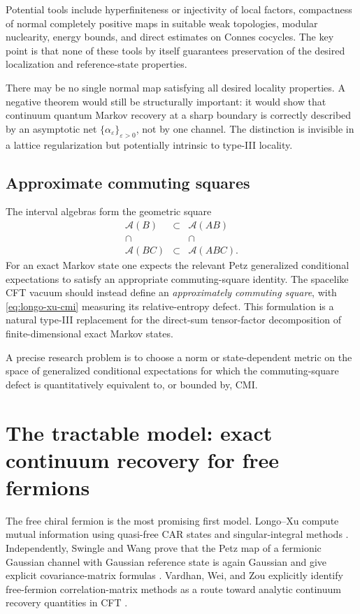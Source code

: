 \documentclass[11pt]{article}
\theoremstyle{accenttheorem}
\theoremstyle{definition}
\newcommand{\cA}{\mathcal{A}}
\newcommand{\eps}{\varepsilon}
\newcommand{\1}{\mathbf{1}}
\begin{document}
Potential tools include hyperfiniteness or injectivity of local factors, compactness of normal completely positive maps in suitable weak topologies, modular nuclearity, energy bounds, and direct estimates on Connes cocycles.  The key point is that none of these tools by itself guarantees preservation of the desired localization and reference-state properties.

\begin{caveatbox}
There may be no single normal map satisfying all desired locality properties.  A negative theorem would still be structurally important: it would show that continuum quantum Markov recovery at a sharp boundary is correctly described by an asymptotic net \(\{\alpha_\eps\}_{\eps>0}\), not by one channel.  The distinction is invisible in a lattice regularization but potentially intrinsic to type-III locality.
\end{caveatbox}

\subsection{Approximate commuting squares}

The interval algebras form the geometric square
\[
\begin{matrix}
 \cA(B) &\subset& \cA(AB)\\[1mm]
 \cap && \cap\\[1mm]
 \cA(BC)&\subset&\cA(ABC).
\end{matrix}
\]
For an exact Markov state one expects the relevant Petz generalized conditional expectations to satisfy an appropriate commuting-square identity.  The spacelike CFT vacuum should instead define an \emph{approximately commuting square}, with \eqref{eq:longo-xu-cmi} measuring its relative-entropy defect.  This formulation is a natural type-III replacement for the direct-sum tensor-factor decomposition of finite-dimensional exact Markov states.

A precise research problem is to choose a norm or state-dependent metric on the space of generalized conditional expectations for which the commuting-square defect is quantitatively equivalent to, or bounded by, CMI.

\section{The tractable model: exact continuum recovery for free fermions}

The free chiral fermion is the most promising first model.  Longo--Xu compute mutual information using quasi-free CAR states and singular-integral methods \cite{LongoXu}.  Independently, Swingle and Wang prove that the Petz map of a fermionic Gaussian channel with Gaussian reference state is again Gaussian and give explicit covariance-matrix formulas \cite{SwingleWang}.  Vardhan, Wei, and Zou explicitly identify free-fermion correlation-matrix methods as a route toward analytic continuum recovery quantities in CFT \cite{VardhanWeiZou}.
\end{document}
